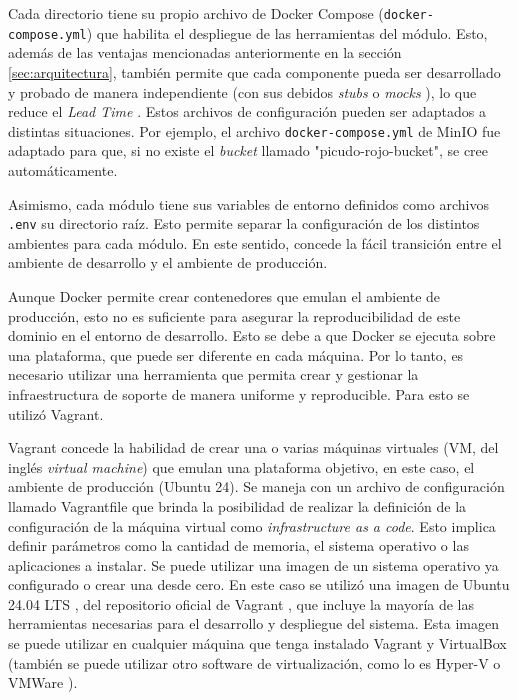 Cada directorio tiene su propio archivo de Docker Compose (\lstinline[language=sh]|docker-compose.yml|) que habilita el despliegue de las herramientas del módulo. Esto, además de las ventajas mencionadas anteriormente en la sección \ref{sec:arquitectura}, también permite que cada componente pueda ser desarrollado y probado de manera independiente (con sus debidos \textit{stubs} \citep{wikipedia_talon_2025} o \textit{mocks} \citep{wikipedia_objeto_2024}), lo que reduce el \textit{Lead Time} \citep{wikipedia_lead_2025}. Estos archivos de configuración pueden ser adaptados a distintas situaciones. Por ejemplo, el archivo \lstinline[language=sh]|docker-compose.yml| de MinIO fue adaptado para que, si no existe el \textit{bucket} llamado "picudo-rojo-bucket", se cree automáticamente.

Asimismo, cada módulo tiene sus variables de entorno definidos como archivos \lstinline[language=sh]|.env| su directorio raíz. Esto permite separar la configuración de los distintos ambientes para cada módulo. En este sentido, concede la fácil transición entre el ambiente de desarrollo y el ambiente de producción.

Aunque Docker permite crear contenedores que emulan el ambiente de producción, esto no es suficiente para asegurar la reproducibilidad de este dominio en el entorno de desarrollo. Esto se debe a que Docker se ejecuta sobre una plataforma, que puede ser diferente en cada máquina. Por lo tanto, es necesario utilizar una herramienta que permita crear y gestionar la infraestructura de soporte de manera uniforme y reproducible. Para esto se utilizó Vagrant.

Vagrant concede la habilidad de crear una o varias máquinas virtuales (VM, del inglés \textit{virtual machine}) que emulan una plataforma objetivo, en este caso, el ambiente de producción (Ubuntu 24). Se maneja con un archivo de configuración llamado Vagrantfile que brinda la posibilidad de realizar la definición de la configuración de la máquina virtual como \textit{infrastructure as a code}. Esto implica definir parámetros como la cantidad de memoria, el sistema operativo o las aplicaciones a instalar. Se puede utilizar una imagen de un sistema operativo ya configurado o crear una desde cero. En este caso se utilizó una imagen de Ubuntu 24.04 LTS \citep{progress_chefs_bento_bentoubuntu-2404_nodate}, del repositorio oficial de Vagrant \citep{hashicorp_hashicorp_nodate}, que incluye la mayoría de las herramientas necesarias para el desarrollo y despliegue del sistema. Esta imagen se puede utilizar en cualquier máquina que tenga instalado Vagrant y VirtualBox \citep{wikipedia_virtualbox_2025} (también se puede utilizar otro software de virtualización, como lo es Hyper-V \citep{meaghanlewis_informacion_2025} o VMWare \citep{wikipedia_vmware_2025}).

